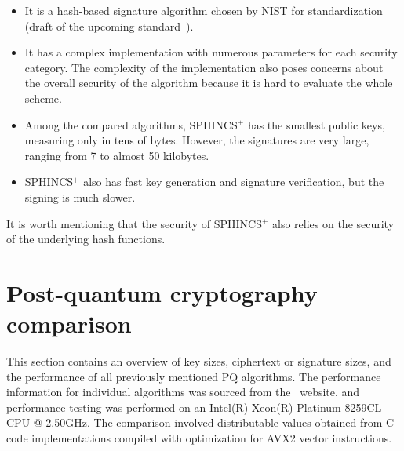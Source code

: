 \begin{itemize}
    \item It is a hash-based signature algorithm chosen by NIST for standardization (draft of the upcoming standard~\cite{signature.man.SPHINCS}).
    \item It has a complex implementation with numerous parameters for each security category. The complexity of the implementation also poses concerns about the overall security of the algorithm because it is hard to evaluate the whole scheme.
    \item Among the compared algorithms, SPHINCS$^+$ has the smallest public keys, measuring only in tens of bytes. However, the signatures are very large, ranging from 7 to almost 50 kilobytes.
    \item SPHINCS$^+$ also has fast key generation and signature verification, but the signing is much slower.
\end{itemize}

It is worth mentioning that the security of SPHINCS$^+$ also relies on the security of the underlying hash functions.


\section{Post-quantum cryptography comparison}
\label{sec:pq.crypto.summary}

This section contains an overview of key sizes, ciphertext or signature sizes, and the performance of all previously mentioned PQ algorithms. The performance information for individual algorithms was sourced from the~\cite{kem.signature.performance} website, and performance testing was performed on an Intel(R) Xeon(R) Platinum 8259CL CPU @ 2.50GHz. The comparison involved distributable values obtained from C-code implementations compiled with optimization for AVX2 vector instructions.

